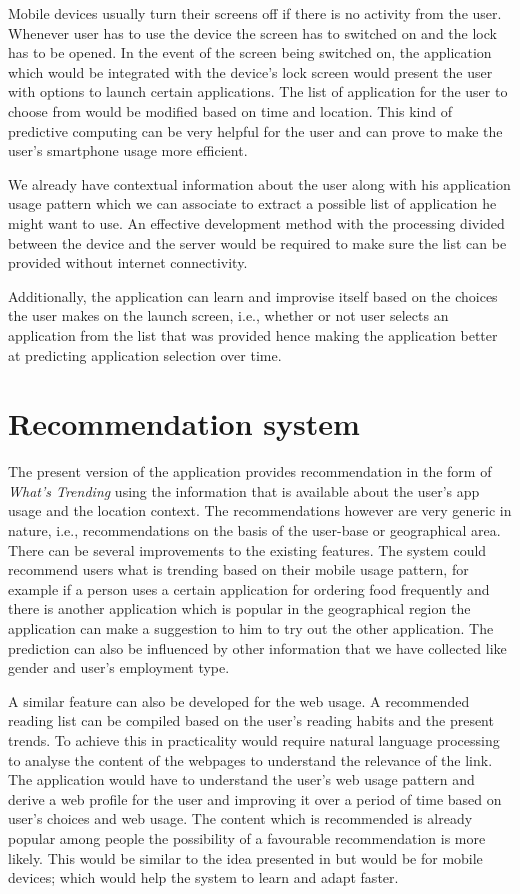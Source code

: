 \documentclass[12pt]{report}
\begin{document}
Mobile devices usually turn their screens off if there is no activity from the user. Whenever user has to use the device the screen has to switched on and the lock has to be opened. In the event of the screen being switched on, the application which would be integrated with the device's lock screen would present the user with options to launch certain applications. The list of application for the user to choose from would be modified based on time and location. This kind of predictive computing can be very helpful for the user and can prove to make the user's smartphone usage more efficient.

We already have contextual information about the user along with his application usage pattern which we can associate to extract a possible list of application he might want to use. An effective development method with the processing divided between the device and the server would be required to make sure the list can be provided without internet connectivity.

Additionally, the application can learn and improvise itself based on the choices the user makes on the launch screen, i.e., whether or not user selects an application from the list that was provided hence making the application better at predicting application selection over time.

\section{Recommendation system}
\label{RecommendationSystem}

The present version of the application provides recommendation in the form of \textit{What's Trending} using the information that is available about the user's app usage and the location context. The recommendations however are very generic in nature, i.e., recommendations on the basis of the user-base or geographical area. There can be several improvements to the existing features. The system could recommend users what is trending based on their mobile usage pattern, for example if a person uses a certain application for ordering food frequently and there is another application which is popular in the geographical region the application can make a suggestion to him to try out the other application. The prediction can also be influenced by other information that we have collected like gender and user's employment type.

A similar feature can also be developed for the web usage. A recommended reading list can be compiled based on the user's reading habits and the present trends. To achieve this in practicality would require natural language processing to analyse the content of the webpages to understand the relevance of the link. The application would have to understand the user's web usage pattern and derive a web profile for the user and improving it over a period of time based on user's choices and web usage. The content which is recommended is already popular among people the possibility of a favourable recommendation is more likely. This would be similar to the idea presented in \cite{BalabanovicAWP1997} but would be for mobile devices; which would help the system to learn and adapt faster.
\end{document}
